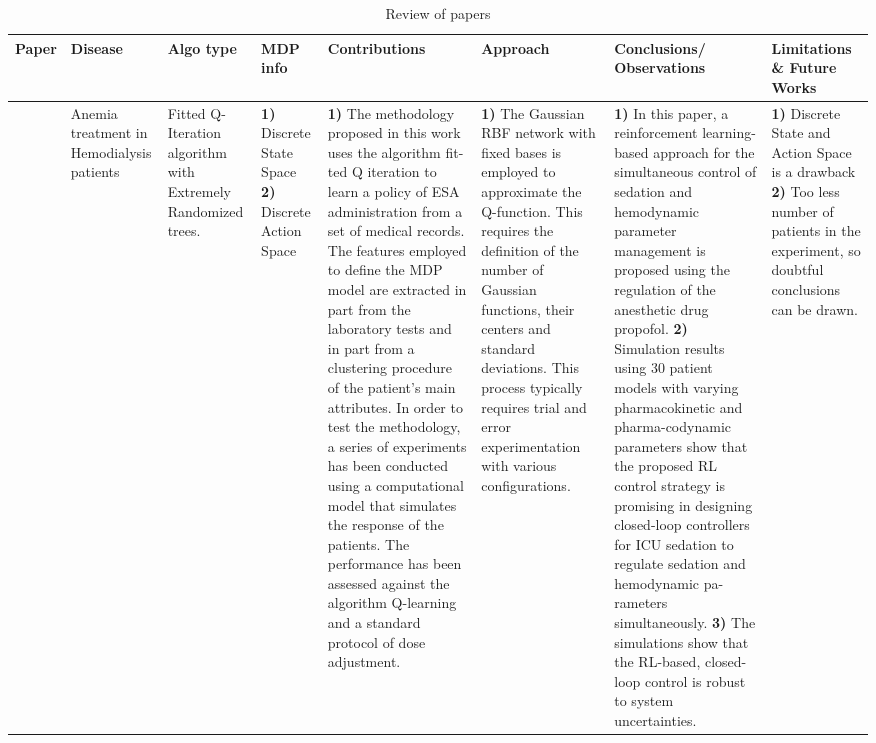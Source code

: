 \begin{table}[!th]
\caption{Review of papers}
\label{tab:review8}
\begin{tabular}{|p{3 em}|p{3 em}|p{3 em}|p{3em}|p{6em}|p{6em}|p{6 em}|p{9em}|}
\toprule
Paper  & Disease  & Algo type & MDP info & Contributions  & Approach & Conclusions/ Observations  & Limitations \& Future Works \\
\hline
\citet{DBLP:journals/artmed/Escandell-MonteroCMGBSMVSGM14} &  Anemia treatment in Hemodialysis patients
& 
Fitted Q-Iteration algorithm with Extremely Randomized trees.
& 
\textbf{1)} Discrete State Space 
\textbf{2)} Discrete Action Space 
&  
\textbf{1)} The methodology proposed in this work uses the algorithm fit-
ted Q iteration to learn a policy of ESA administration from a set of medical records. The features employed to define the MDP model
are extracted in part from the laboratory tests and in part from a
clustering procedure of the patient’s main attributes. In order to
test the methodology, a series of experiments has been conducted
using a computational model that simulates the response of the
patients. The performance has been assessed against the algorithm
Q-learning and a standard protocol of dose adjustment.
&
\textbf{1)} The Gaussian RBF network with fixed bases is employed to approximate the Q-function. This requires the definition of the number of
Gaussian functions, their centers and standard deviations. This process typically requires trial and error experimentation with various configurations. 
& 
\textbf{1)} In this paper, a reinforcement learning-based approach
for the simultaneous control of sedation and hemodynamic
parameter management is proposed using the regulation of
the anesthetic drug propofol. 
\textbf{2)} Simulation results using 30 patient models with varying pharmacokinetic and pharma-codynamic parameters show that the proposed RL control strategy is promising in designing closed-loop controllers for ICU sedation to regulate sedation and hemodynamic pa-
rameters simultaneously. \textbf{3)} The simulations show
that the RL-based, closed-loop control is robust to system
uncertainties. 
& 
\textbf{1)}  Discrete State and Action Space is a drawback
\textbf{2)} Too less number of patients in the experiment, so doubtful conclusions can be drawn.
   \\\midrule
\end{tabular}
\vspace*{-2em}
\end{table}   


